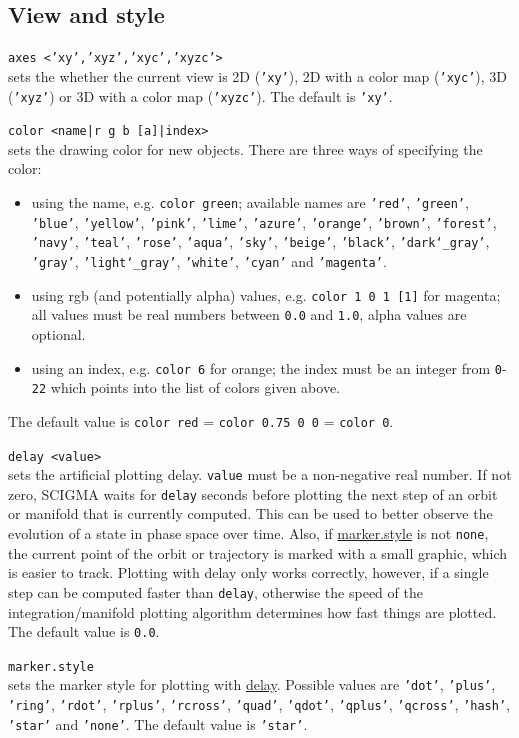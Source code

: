 \documentclass[10pt,a4paper,titlepage]{article}
\newcommand{\opt}[2]{\item{\T{\hypertarget{#1}{#1}\index[index]{#1} #2}}}
\newcommand{\HL}[1]{\hyperlink{#1}{#1}}
\newcommand{\T}[1]{\texttt{#1}}
\begin{document}
\subsection{View and style}
\begin{description}
\opt{axes}{<'xy','xyz','xyc','xyzc'>}\\
sets the whether the current view is 2D (\T{'xy'}), 2D with a color map (\T{'xyc'}), 3D (\T{'xyz'}) or 3D with a color map (\T{'xyzc'}). The default is \T{'xy'}.
\opt{color}{<name|r g b [a]|index>}\\
sets the drawing color for new objects. There are three ways of specifying the color:
\begin{itemize}
\item{using the name, e.g. \T{color green}; available names are \T{'red'}, \T{'green'}, \T{'blue'}, \T{'yellow'}, \T{'pink'}, \T{'lime'}, \T{'azure'}, \T{'orange'}, \T{'brown'}, \T{'forest'}, \T{'navy'}, \T{'teal'}, \T{'rose'}, \T{'aqua'}, \T{'sky'}, \T{'beige'}, \T{'black'}, \T{'dark\char`_gray'}, \T{'gray'}, \T{'light\char`_gray'}, \T{'white'}, \T{'cyan'} and \T{'magenta'}.}
\item{using rgb (and potentially alpha) values, e.g. \T{color 1 0 1 [1]} for magenta; all values must be real numbers between \T{0.0} and \T{1.0}, alpha values are optional.}
\item{using  an index, e.g. \T{color 6} for orange; the index must be an integer from \T{0}-\T{22} which points into the list of colors given above.}
\end{itemize}
The default value is \T{color red} = \T{color 0.75 0 0} = \T{color 0}.
\opt{delay}{<value>}\\
sets the artificial plotting delay. \T{value} must be a non-negative real number. If not zero, SCIGMA waits for \T{delay} seconds before plotting the next step of an orbit or manifold that is currently computed. This can be used to better observe the evolution of a state in phase space over time. Also, if \HL{marker.style} is not \T{none}, the current point of the orbit or trajectory is marked with a small graphic, which is easier to track. Plotting with delay only works correctly, however, if a single step can be computed faster than \T{delay}, otherwise the speed of the integration/manifold plotting algorithm determines how fast things are plotted. The default value is \T{0.0}.  
\opt{marker.style}{}\\
sets the marker style for plotting with \HL{delay}. Possible values are \T{'dot'}, \T{'plus'}, \T{'ring'}, \T{'rdot'}, \T{'rplus'}, \T{'rcross'}, \T{'quad'}, \T{'qdot'}, \T{'qplus'}, \T{'qcross'}, \T{'hash'}, \T{'star'} and \T{'none'}. The default value is \T{'star'}. 

\end{description}
\end{document}
